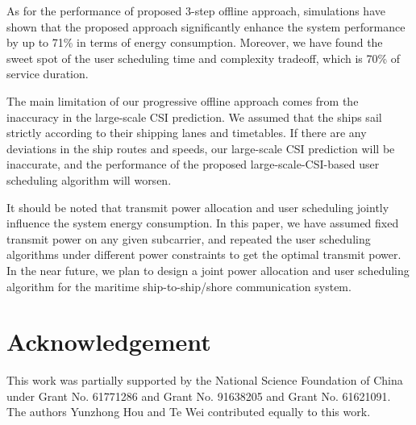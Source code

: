 \documentclass[conference]{IEEEtran}
\begin{document}
 As for the performance of proposed 3-step offline approach, simulations have shown that the proposed approach significantly enhance the system performance by up to 71\% in terms of energy consumption. 
 Moreover, we have found the sweet spot of the user scheduling time and complexity tradeoff, which is 70\% of service duration.

 The main limitation of our progressive offline approach comes from the inaccuracy in the large-scale CSI prediction. We assumed that the ships sail strictly according to their shipping lanes and timetables. If there are any deviations in the ship routes and speeds, our large-scale CSI prediction will be inaccurate, and the performance of the proposed large-scale-CSI-based user scheduling algorithm will worsen. 
 
 It should be noted that transmit power allocation and user scheduling jointly influence the system energy consumption. In this paper, we have assumed fixed transmit power on any given subcarrier, and repeated the user scheduling algorithms under different power constraints to get the optimal transmit power. In the near future, we plan to design a joint power allocation and user scheduling algorithm for the maritime ship-to-ship/shore communication system. 

 
 
 
 \section*{Acknowledgement}
 
 This work was partially supported by the National Science Foundation of China under Grant No. 61771286 and Grant No. 91638205 and Grant No. 61621091. The authors Yunzhong Hou and Te Wei contributed equally to this work.
 
\end{document}
